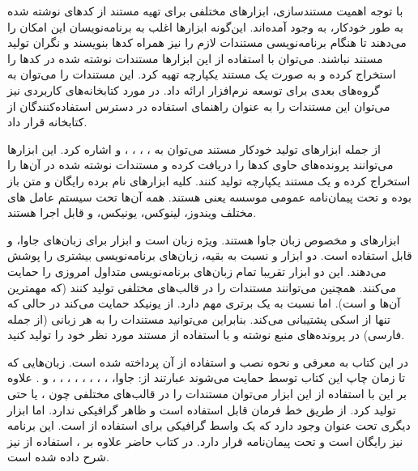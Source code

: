 با توجه اهمیت مستندسازی، ابزارهای مختلفی برای تهیه مستند از کدهای نوشته شده به
طور خودکار، به وجود آمده‌اند. این‌گونه ابزارها اغلب به برنامه‌نویسان این امکان
را می‌دهند تا هنگام برنامه‌نویسی مستندات لازم را نیز همراه کدها بنویسند و نگران
تولید مستند نباشند. می‌توان با استفاده از این ابزارها مستندات نوشته شده در کدها
را استخراج کرده و به صورت یک مستند یکپارچه تهیه کرد. این مستندات را می‌توان به
گروه‌های بعدی برای توسعه نرم‌افزار ارائه داد. در مورد کتابخانه‌های کاربردی نیز
می‌توان این مستندات را به عنوان راهنمای استفاده در دسترس استفاده‌کنندگان از
کتابخانه قرار داد.

\begin{sloppypar}
از جمله ابزارهای تولید خودکار مستند می‌توان به 
، ، ، ،  و  
اشاره کرد. این ابزارها می‌توانند پرونده‌های حاوی کدها را دریافت کرده و مستندات نوشته شده در آن‌ها 
را استخراج کرده و یک مستند یکپارچه تولید کنند. کلیه ابزارهای نام برده رایگان و متن باز بوده و 
تحت پیمان‌نامه عمومی موسسه  یعنی  هستند. 
همه آن‌ها تحت سیستم عامل های مختلف ویندوز، لینوکس، یونیکس،  و  قابل اجرا هستند. 
\end{sloppypar}

ابزارهای  و  مخصوص زبان جاوا هستند.  ویژه
زبان  است و ابزار  برای زبان‌های جاوا،  و 
قابل استفاده است. دو ابزار  و  نسبت به بقیه، زبان‌های
برنامه‌نویسی بیشتری را پوشش می‌دهند. این دو ابزار تقریبا تمام زبان‌های
برنامه‌نویسی متداول امروزی را حمایت می‌کنند. همچنین می‌توانند مستندات را در
قالب‌های مختلفی تولید کنند (که مهمترین آن‌ها  و  است).
اما  نسبت به  یک برتری مهم دارد.  از یونیکد
حمایت می‌کند در حالی که  تنها از اسکی پشتیبانی می‌کند. بنابراین 
می‌توانید مستندات را به هر زبانی (از جمله فارسی) در پرونده‌های منبع نوشته و با
استفاده از  مستند مورد نظر خود را تولید کنید.

\begin{sloppypar}
در این کتاب به معرفی  و نحوه نصب و استفاده از آن پرداخته شده است. زبان‌هایی که تا زمان چاپ این کتاب 
توسط  حمایت می‌شوند عبارتند از: جاوا، 
، ، ، ، ، ، ، ،  و . 
علاوه بر این با استفاده از این ابزار می‌توان مستندات را در قالب‌های 
مختلفی چون ،  یا حتی \lr{\LaTeX} تولید کرد.  از طریق خط فرمان قابل استفاده است و 
ظاهر گرافیکی ندارد. اما ابزار دیگری تحت عنوان  وجود دارد که یک واسط گرافیکی 
برای استفاده از  است. این برنامه نیز رایگان است و تحت پیمان‌نامه  قرار دارد. در کتاب حاضر 
علاوه بر ، استفاده از  نیز شرح داده شده است.
\end{sloppypar}

